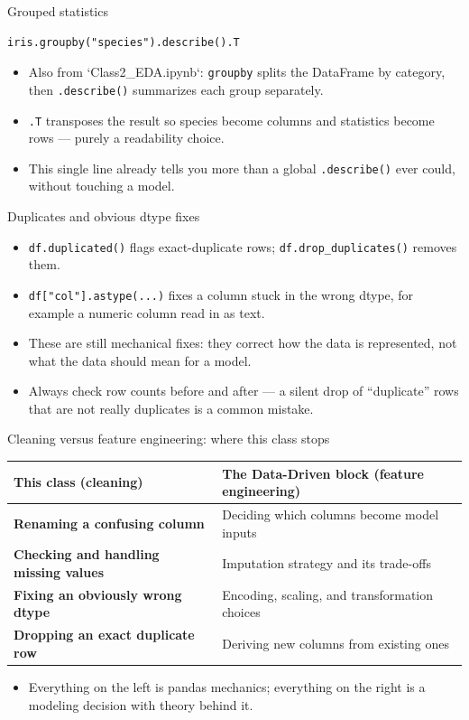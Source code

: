 \begin{frame}[fragile]{Grouped statistics}
\begin{lstlisting}[style=coursepython]
iris.groupby("species").describe().T
\end{lstlisting}
\begin{itemize}
\item Also from `Class2\_EDA.ipynb`: \texttt{groupby} splits the DataFrame by category, then \texttt{.describe()} summarizes each group separately.
\item \texttt{.T} transposes the result so species become columns and statistics become rows --- purely a readability choice.
\item This single line already tells you more than a global \texttt{.describe()} ever could, without touching a model.
\end{itemize}
\coursefooter
\end{frame}

\begin{frame}{Duplicates and obvious dtype fixes}
\begin{itemize}
\item \texttt{df.duplicated()} flags exact-duplicate rows; \texttt{df.drop\_duplicates()} removes them.
\item \texttt{df["col"].astype(...)} fixes a column stuck in the wrong dtype, for example a numeric column read in as text.
\item These are still mechanical fixes: they correct how the data is represented, not what the data should mean for a model.
\item Always check row counts before and after --- a silent drop of ``duplicate'' rows that are not really duplicates is a common mistake.
\end{itemize}
\coursefooter
\end{frame}

\begin{frame}{Cleaning versus feature engineering: where this class stops}
\begin{tabularx}{\textwidth}{>{\bfseries}l X}
This class (cleaning) & The Data-Driven block (feature engineering) \\
\toprule
Renaming a confusing column & Deciding which columns become model inputs \\
Checking and handling missing values & Imputation strategy and its trade-offs \\
Fixing an obviously wrong dtype & Encoding, scaling, and transformation choices \\
Dropping an exact duplicate row & Deriving new columns from existing ones \\
\bottomrule
\end{tabularx}
\vspace{0.4em}
\begin{itemize}
\item Everything on the left is pandas mechanics; everything on the right is a modeling decision with theory behind it.
\end{itemize}
\coursefooter
\end{frame}

